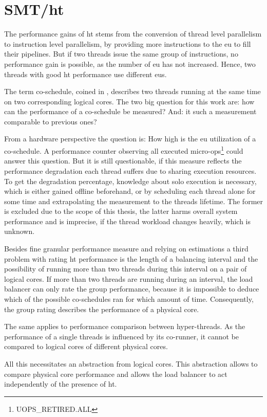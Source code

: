 \section{SMT/\gls{ht}}
\label{design:smt}


The performance gains of \gls{ht} stems from the conversion of thread level
parallelism to instruction level parallelism, by providing more instructions to
the \gls{eu} to fill their pipelines.
But if two threads issue the same group of instructions, no performance gain is
possible, as the number of \gls{eu} has not increased.
Hence, two threads with good \gls{ht} performance use different \gls{eu}s.

The term co-schedule, coined in \cite{snavely_symbiotic_2000}, describes two
threads running at the same time on two corresponding logical cores.
The two big question for this work are: how can the performance of a co-schedule be
measured? And: it such a measurement comparable to previous ones?

From a hardware perspective the question is: How high is the \gls{eu}
utilization of a co-schedule.
A performance counter observing all executed
micro-ops\footnote{UOPS\_RETIRED.ALL} could answer this question.
But it is still questionable, if this measure reflects the performance
degradation each thread suffers due to sharing execution resources.
To get the degradation percentage, knowledge about solo execution is necessary,
which is either gained offline beforehand, or by scheduling each thread alone
for some time and extrapolating the measurement to the threads lifetime.
The former is excluded due to the scope of this thesis, the latter harms
overall system performance and is imprecise, if the thread workload changes
heavily, which is unknown.

Besides fine granular performance measure and relying on estimations a third
problem with rating \gls{ht} performance is the length of a balancing interval
and the possibility of running more than two threads during this interval on a
pair of logical cores.
If more than two threads are running during an interval, the load balancer can
only rate the group performance, because it is impossible to deduce which
of the possible co-schedules ran for which amount of time.
Consequently, the group rating describes the performance of a physical core.

The same applies to performance comparison between hyper-threads. As the
performance of a single threads is influenced by its co-runner, it cannot be
compared to logical cores of different physical cores.

All this necessitates an abstraction from logical cores.
This abstraction allows to compare physical core performance and allows the
load balancer to act independently of the presence of \gls{ht}.
